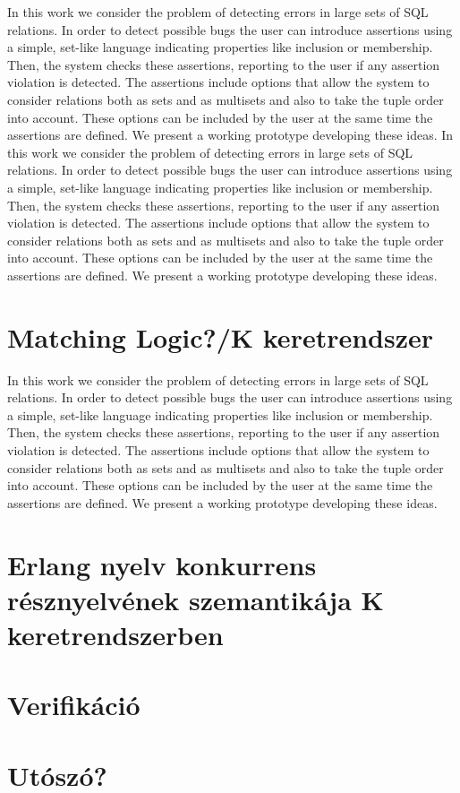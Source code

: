 \documentclass[12pt, a4paper, top=2.5cm]{book}
\begin{document}
In this work we consider the problem of detecting errors in large sets of SQL relations. In order to detect possible bugs the user can introduce assertions using a simple, set-like language indicating properties like inclusion or membership. Then, the system checks these assertions, reporting to the user if any assertion violation is detected.
The assertions include options that allow the system to consider relations both as sets and as multisets and also to take the tuple order into account. These options can be included by the user at the same time the assertions are defined. We present a working prototype developing these ideas.
In this work we consider the problem of detecting errors in large sets of SQL relations. In order to detect possible bugs the user can introduce assertions using a simple, set-like language indicating properties like inclusion or membership. Then, the system checks these assertions, reporting to the user if any assertion violation is detected.
The assertions include options that allow the system to consider relations both as sets and as multisets and also to take the tuple order into account. These options can be included by the user at the same time the assertions are defined. We present a working prototype developing these ideas.

\chapter{Matching Logic?/K keretrendszer}
In this work we consider the problem of detecting errors in large sets of SQL relations. In order to detect possible bugs the user can introduce assertions using a simple, set-like language indicating properties like inclusion or membership. Then, the system checks these assertions, reporting to the user if any assertion violation is detected.
The assertions include options that allow the system to consider relations both as sets and as multisets and also to take the tuple order into account. These options can be included by the user at the same time the assertions are defined. We present a working prototype developing these ideas.

\chapter{Erlang nyelv konkurrens résznyelvének szemantikája K keretrendszerben}

\chapter{Verifikáció}

\chapter{Utószó?}


\newpage

\printbibliography[title = {Referencia}]
\end{document}
